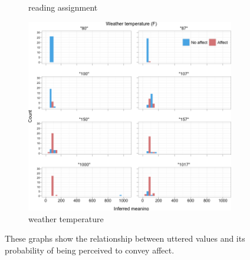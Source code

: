 \documentclass{article} %
\begin{document}
\begin{figure}
\begin{subfigure}[b]{0.33\textwidth}
		\caption{reading assignment}
	\end{subfigure}
	\begin{subfigure}[b]{0.33\textwidth}
                \centering
                \includegraphics[width=\textwidth]{humans_all_weather.png}
		\caption{weather temperature}
	\end{subfigure}
	\caption{These graphs show the relationship between uttered values and its probability of being perceived to convey affect.}
\end{figure}


\end{document}
